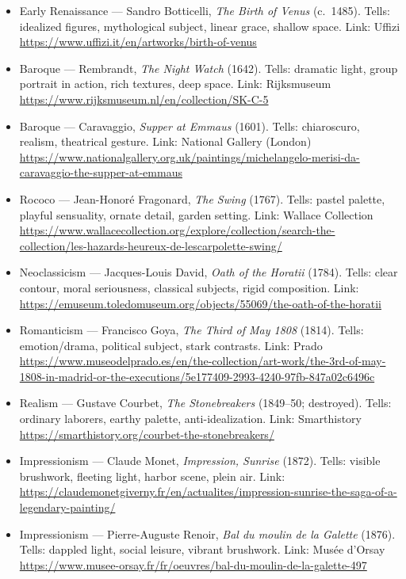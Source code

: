 \documentclass[12pt]{article}
\begin{document}
\begin{itemize}
  \item Early Renaissance — Sandro Botticelli, \emph{The Birth of Venus} (c.\ 1485). Tells: idealized figures, mythological subject, linear grace, shallow space. Link: Uffizi \url{https://www.uffizi.it/en/artworks/birth-of-venus}
  \item Baroque — Rembrandt, \emph{The Night Watch} (1642). Tells: dramatic light, group portrait in action, rich textures, deep space. Link: Rijksmuseum \url{https://www.rijksmuseum.nl/en/collection/SK-C-5}
  \item Baroque — Caravaggio, \emph{Supper at Emmaus} (1601). Tells: chiaroscuro, realism, theatrical gesture. Link: National Gallery (London) \url{https://www.nationalgallery.org.uk/paintings/michelangelo-merisi-da-caravaggio-the-supper-at-emmaus}
  \item Rococo — Jean-Honoré Fragonard, \emph{The Swing} (1767). Tells: pastel palette, playful sensuality, ornate detail, garden setting. Link: Wallace Collection \url{https://www.wallacecollection.org/explore/collection/search-the-collection/les-hazards-heureux-de-lescarpolette-swing/}
  \item Neoclassicism — Jacques-Louis David, \emph{Oath of the Horatii} (1784). Tells: clear contour, moral seriousness, classical subjects, rigid composition. Link: \url{https://emuseum.toledomuseum.org/objects/55069/the-oath-of-the-horatii}
  \item Romanticism — Francisco Goya, \emph{The Third of May 1808} (1814). Tells: emotion/drama, political subject, stark contrasts. Link: Prado \url{https://www.museodelprado.es/en/the-collection/art-work/the-3rd-of-may-1808-in-madrid-or-the-executions/5e177409-2993-4240-97fb-847a02c6496c}
  \item Realism — Gustave Courbet, \emph{The Stonebreakers} (1849–50; destroyed). Tells: ordinary laborers, earthy palette, anti-idealization. Link: Smarthistory \url{https://smarthistory.org/courbet-the-stonebreakers/}
  \item Impressionism — Claude Monet, \emph{Impression, Sunrise} (1872). Tells: visible brushwork, fleeting light, harbor scene, plein air. Link: \url{https://claudemonetgiverny.fr/en/actualites/impression-sunrise-the-saga-of-a-legendary-painting/}
  \item Impressionism — Pierre-Auguste Renoir, \emph{Bal du moulin de la Galette} (1876). Tells: dappled light, social leisure, vibrant brushwork. Link: Musée d’Orsay \url{https://www.musee-orsay.fr/fr/oeuvres/bal-du-moulin-de-la-galette-497}

\end{itemize}
\end{document}
